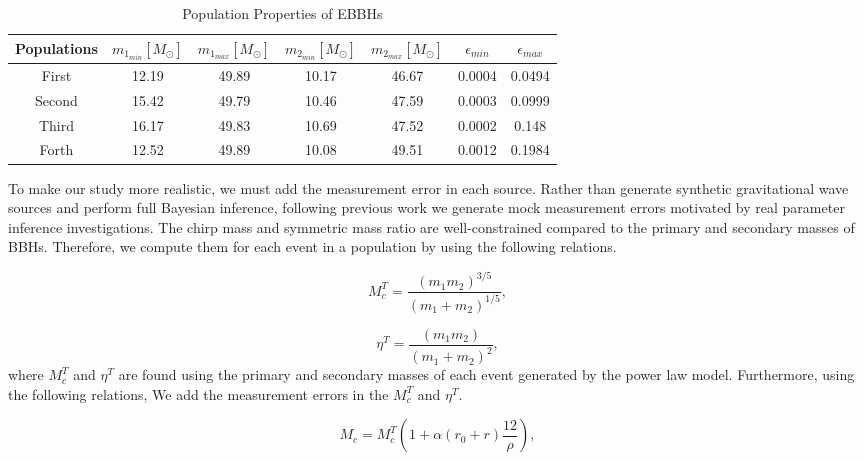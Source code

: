 \documentclass[twocolumn,prd,nofootinbib]{revtex4}
\begin{document}
\begin{table}[]
    \centering
    \begin{tabular}{c|cccccc}
        \hline \hline
        Populations & $m_{1_{min}} [M_\odot] $ & $m_{1_{max}} [M_\odot]$ & $m_{2_{min}} [M_\odot]$ & $m_{2_{max}} [M_\odot]$ & $\epsilon_{min}$ & $\epsilon_{max}$\\ \hline
        First  & 12.19 & 49.89 & 10.17 & 46.67 & 0.0004 & 0.0494\\ \hline
        Second  & 15.42 & 49.79 & 10.46 & 47.59 & 0.0003 & 0.0999\\ \hline
        Third  & 16.17 & 49.83 & 10.69 & 47.52 & 0.0002 & 0.148\\ \hline
        Forth  & 12.52 & 49.89 & 10.08 & 49.51 & 0.0012 & 0.1984\\ \hline
    \end{tabular}
    \caption{Population Properties of EBBHs}
    \label{tab:pop_prop}
\end{table}

To make our study more realistic, we must add the measurement error in each source.  Rather than generate synthetic gravitational wave sources and perform full Bayesian inference, following previous work \cite{Mandel_2017_Errors} we generate mock measurement errors motivated by real parameter inference investigations. The chirp mass and symmetric mass ratio are well-constrained compared to the primary and secondary masses of BBHs. Therefore, we compute them for each event in a population by using the following relations.

\begin{equation}
    M_c^T = \frac{(m_1 m_2)^{3/5}}{(m_1+m_2)^{1/5}},
\end{equation}

\begin{equation}
    \eta^T = \frac{(m_1 m_2)}{(m_1+m_2)^2},
\end{equation}
%
where $M_c^T$ and $\eta^T$ are found using the primary and secondary masses of each event generated by the power law model.
Furthermore, using the following relations, We add the measurement errors in the $M_c^T$ and $\eta^T$.

\begin{equation}
    M_c = M_c^T\left( 1+\alpha (r_0+r ) \frac{12}{\rho}\right),
\end{equation}
\end{document}
